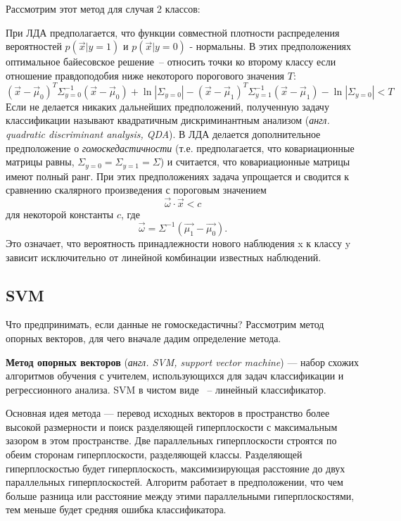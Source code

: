 Рассмотрим этот метод для случая 2 классов:

При ЛДА предполагается, что функции совместной плотности распределения вероятностей $p(\vec{x}|y=1)$ и $p(\vec{x}|y=0)$ - нормальны. В этих предположениях оптимальное байесовское решение~-- относить точки ко второму классу если отношение правдоподобия ниже некоторого порогового значения $T$: 
$$(\vec{x}-\vec{\mu}_0)^T\Sigma_{y=0}^{-1}(\vec{x}-\vec{\mu}_0)+\ln{|\Sigma _{y=0}|}-(\vec{x}-\vec{\mu}_1)^T\Sigma _{y=1}^{-1}(\vec{x}-\vec{\mu}_1)-\ln{|\Sigma_{y=0}|}<T$$
Если не делается никаких дальнейших предположений, полученную задачу классификации называют квадратичным дискриминантным анализом (\textit{англ. quadratic discriminant analysis, QDA}). В ЛДА делается дополнительное предположение о \textit{гомоскедастичности} (т.е. предполагается, что ковариационные матрицы равны, $\Sigma_{y=0}=\Sigma_{y=1}=\Sigma$) и считается, что ковариационные матрицы имеют полный ранг. При этих предположениях задача упрощается и сводится к сравнению скалярного произведения с пороговым значением 
$$\vec{\omega}\cdot\vec{x}<c $$
\noindent
для некоторой константы $c$, где 
$$\vec{\omega}=\Sigma^{-1}(\vec{\mu_1}-\vec{\mu_0}). $$
\noindent
Это означает, что вероятность принадлежности нового наблюдения x к классу y зависит исключительно от линейной комбинации известных наблюдений.


\subsection{SVM}
Что предпринимать, если данные не гомоскедастичны?
Рассмотрим метод опорных векторов, для чего вначале дадим определение метода.

\textbf{Метод опорных векторов} (\emph {англ. SVM, support vector machine}) — набор схожих алгоритмов обучения с учителем, использующихся для задач классификации и регрессионного анализа. SVM в чистом виде ~-- линейный классификатор.

Основная идея метода — перевод исходных векторов в пространство более высокой размерности и поиск разделяющей гиперплоскости с максимальным зазором в этом пространстве. Две параллельных гиперплоскости строятся по обеим сторонам гиперплоскости, разделяющей классы. Разделяющей гиперплоскостью будет гиперплоскость, максимизирующая расстояние до двух параллельных гиперплоскостей. Алгоритм работает в предположении, что чем больше разница или расстояние между этими параллельными гиперплоскостями, тем меньше будет средняя ошибка классификатора.


